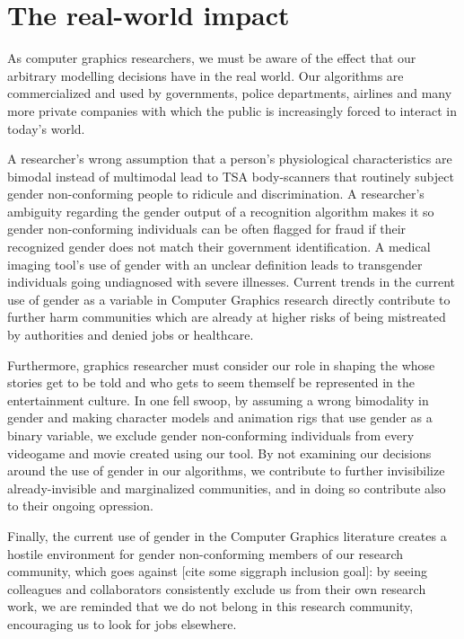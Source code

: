 \documentclass[acmtog,nonacm,review,balance=false]{acmart}
\begin{document}
\section{The real-world impact}

As computer graphics researchers, we must be aware of the effect that our
arbitrary modelling decisions have in the real world. Our algorithms are
commercialized and used by governments, police departments, airlines and many
more private companies with which the public is increasingly forced to interact
in today's world.

A researcher's wrong assumption that a person's physiological characteristics
are bimodal instead of multimodal lead to TSA body-scanners that routinely
subject gender non-conforming people to ridicule and discrimination. A
researcher's ambiguity regarding the gender output of a recognition algorithm
makes it so gender non-conforming individuals can be often flagged for fraud if
their recognized gender does not match their government identification. A
medical imaging tool's use of gender with an unclear definition leads to
transgender individuals going undiagnosed with severe illnesses. Current trends
in the current use of gender as a variable in Computer Graphics research
directly contribute to further harm communities which are already at higher
risks of being mistreated by authorities and denied jobs or healthcare. 

Furthermore, graphics researcher must consider our role in shaping the
whose stories get to be told and who gets to seem themself be represented in the
entertainment culture. In one fell swoop, by assuming a wrong bimodality in gender and 
making character models and animation rigs that use
gender as a binary variable, we exclude gender non-conforming individuals from
every videogame and movie created using our tool. By not examining our decisions
around the use of gender in our algorithms, we contribute to further invisibilize 
already-invisible and marginalized communities, and in doing so contribute also
to their ongoing opression.

Finally, the current use of gender in the Computer Graphics literature creates a
hostile environment for gender non-conforming members of our research community,
which goes against [cite some siggraph inclusion goal]: by seeing colleagues and
collaborators consistently exclude us from their own research work, we are
reminded that we do not belong in this research community, encouraging us to
look for jobs elsewhere.
\end{document}
